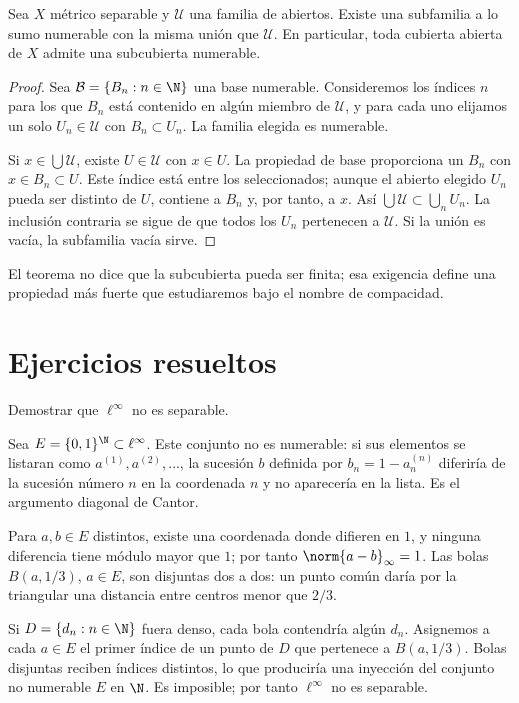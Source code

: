 \begin{teorema}[Lindelöf]\label{ch06:lindelof}
Sea $X$ métrico separable y $\mathcal U$ una familia de abiertos. Existe una subfamilia a lo sumo numerable con la misma unión que $\mathcal U$. En particular, toda cubierta abierta de $X$ admite una subcubierta numerable.
\end{teorema}
\begin{proof}
Sea $\mathcal B=\{B_n:n\in\N\}$ una base numerable. Consideremos los índices $n$ para los que $B_n$ está contenido en algún miembro de $\mathcal U$, y para cada uno elijamos un solo $U_n\in\mathcal U$ con $B_n\subset U_n$. La familia elegida es numerable.

Si $x\in\bigcup\mathcal U$, existe $U\in\mathcal U$ con $x\in U$. La propiedad de base proporciona un $B_n$ con $x\in B_n\subset U$. Este índice está entre los seleccionados; aunque el abierto elegido $U_n$ pueda ser distinto de $U$, contiene a $B_n$ y, por tanto, a $x$. Así $\bigcup\mathcal U\subset\bigcup_nU_n$. La inclusión contraria se sigue de que todos los $U_n$ pertenecen a $\mathcal U$. Si la unión es vacía, la subfamilia vacía sirve.
\end{proof}
El teorema no dice que la subcubierta pueda ser finita; esa exigencia define una propiedad más fuerte que estudiaremos bajo el nombre de compacidad.

\section{Ejercicios resueltos}
\begin{ejercicio}
Demostrar que $\ell^\infty$ no es separable.
\end{ejercicio}
\begin{solucion}
Sea $E=\{0,1\}^{\N}\subset\ell^\infty$. Este conjunto no es numerable: si sus elementos se listaran como $a^{(1)},a^{(2)},\ldots$, la sucesión $b$ definida por $b_n=1-a^{(n)}_n$ diferiría de la sucesión número $n$ en la coordenada $n$ y no aparecería en la lista. Es el argumento diagonal de Cantor.

Para $a,b\in E$ distintos, existe una coordenada donde difieren en $1$, y ninguna diferencia tiene módulo mayor que $1$; por tanto $\norm{a-b}_\infty=1$. Las bolas $B(a,1/3)$, $a\in E$, son disjuntas dos a dos: un punto común daría por la triangular una distancia entre centros menor que $2/3$.

Si $D=\{d_n:n\in\N\}$ fuera denso, cada bola contendría algún $d_n$. Asignemos a cada $a\in E$ el primer índice de un punto de $D$ que pertenece a $B(a,1/3)$. Bolas disjuntas reciben índices distintos, lo que produciría una inyección del conjunto no numerable $E$ en $\N$. Es imposible; por tanto $\ell^\infty$ no es separable.
\end{solucion}

